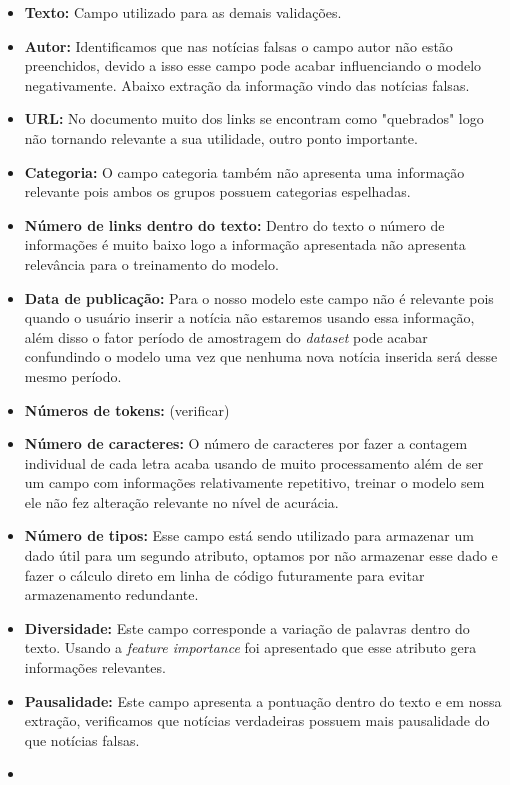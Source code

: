 \documentclass[
  brazilian,
  11pt,
]{article}
\begin{document}
\begin{itemize}
\item
  \textbf{Texto:} Campo utilizado para as demais validações.
\item
  \textbf{Autor:} Identificamos que nas notícias falsas o campo autor não estão preenchidos, devido a isso esse campo pode acabar influenciando o modelo negativamente. Abaixo extração da informação vindo das notícias falsas.
\item
  \textbf{URL:} No documento muito dos links se encontram como "quebrados" logo não tornando relevante a sua utilidade, outro ponto importante.
\item
  \textbf{Categoria:} O campo categoria também não apresenta uma informação relevante pois ambos os grupos possuem categorias espelhadas.
\item
  \textbf{Número de links dentro do texto:} Dentro do texto o número de informações é muito baixo logo a informação apresentada não apresenta relevância para o treinamento do modelo.
\item
  \textbf{Data de publicação:} Para o nosso modelo este campo não é relevante pois quando o usuário inserir a notícia não estaremos usando essa informação, além disso o fator período de amostragem do \emph{dataset} pode acabar confundindo o modelo uma vez que nenhuma nova notícia inserida será desse mesmo período.
\item
  \textbf{Números de tokens:} (verificar)
\item
  \textbf{Número de caracteres:} O número de caracteres por fazer a contagem individual de cada letra acaba usando de muito processamento além de ser um campo com informações relativamente repetitivo, treinar o modelo sem ele não fez alteração relevante no nível de acurácia.
\item
  \textbf{Número de tipos:} Esse campo está sendo utilizado para armazenar um dado útil para um segundo atributo, optamos por não armazenar esse dado e fazer o cálculo direto em linha de código futuramente para evitar armazenamento redundante.
\item
  \textbf{Diversidade:} Este campo corresponde a variação de palavras dentro do texto. Usando a \emph{feature importance} foi apresentado que esse atributo gera informações relevantes.
\item
  \textbf{Pausalidade:} Este campo apresenta a pontuação dentro do texto e em nossa extração, verificamos que notícias verdadeiras possuem mais pausalidade do que notícias falsas.
\item

\end{itemize}
\end{document}
